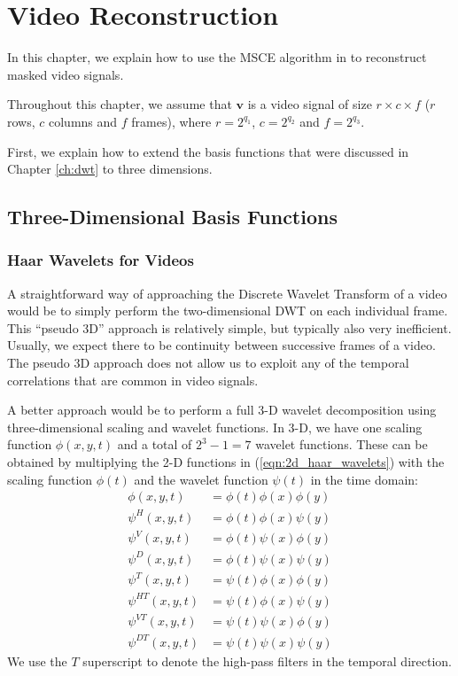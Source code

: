 \chapter{Video Reconstruction}
\label{ch:video}
In this chapter, we explain how to use the MSCE algorithm in \cite{pilikos2014} to reconstruct masked video signals.

Throughout this chapter, we assume that $\bm v$ is a video signal of size $r\times c\times f$ ($r$ rows, $c$ columns and $f$ frames), where $r=2^{q_1}$, $c=2^{q_2}$ and $f=2^{q_3}$.

First, we explain how to extend the basis functions that were discussed in Chapter \ref{ch:dwt} to three dimensions.

\section{Three-Dimensional Basis Functions}
\subsection{Haar Wavelets for Videos}
A straightforward way of approaching the Discrete Wavelet Transform of a video would be to simply perform the two-dimensional DWT on each individual frame. 
This ``pseudo 3D'' approach is relatively simple, but typically also very inefficient.
Usually, we expect there to be continuity between successive frames of a video.
The pseudo 3D approach does not allow us to exploit any of the temporal correlations that are common in video signals.

A better approach would be to perform a full 3-D wavelet decomposition using three-dimensional scaling and wavelet functions.
In 3-D, we have one scaling function $\phi(x,y,t)$ and a total of $2^3-1=7$ wavelet functions.
These can be obtained by multiplying the 2-D functions in (\ref{eqn:2d_haar_wavelets}) with the scaling function $\phi(t)$ and the wavelet function $\psi(t)$ in the time domain:
\begin{equation*}
  \begin{split}
    \phi(x,y,t) &= \phi(t) \phi(x) \phi(y)\\
    \psi^H(x,y,t) &=\phi(t) \phi(x) \psi(y) \\
    \psi^V(x,y,t) &=\phi(t) \psi(x) \phi(y) \\
    \psi^D(x,y,t) &=\phi(t) \psi(x) \psi(y) \\
    \psi^T(x,y,t) &= \psi(t) \phi(x) \phi(y)\\
    \psi^{HT}(x,y,t) &=\psi(t) \phi(x) \psi(y) \\
    \psi^{VT}(x,y,t) &=\psi(t) \psi(x) \phi(y) \\
    \psi^{DT}(x,y,t) &=\psi(t) \psi(x) \psi(y)
  \end{split}
\end{equation*}
We use the $T$ superscript to denote the high-pass filters in the temporal direction.

